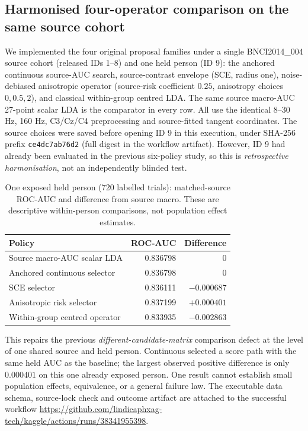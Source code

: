 \subsection{Harmonised four-operator comparison on the same source cohort}
\label{sec:p3-four-operator-matrix}
We implemented the four original proposal families under a
single BNCI2014\_004 source cohort (released IDs 1--8) and
one held person (ID 9): the anchored continuous source-AUC
search, source-contrast envelope (SCE, radius one),
noise-debiased anisotropic operator (source-risk coefficient
$0.25$, anisotropy choices $0,0.5,2$), and classical
within-group centred LDA. The same source macro-AUC
27-point scalar LDA is the comparator in every row.
All use the identical 8--30 Hz, 160 Hz, C3/Cz/C4
preprocessing and source-fitted tangent coordinates.
The source choices were saved before opening ID 9 in this
execution, under SHA-256 prefix
\texttt{ce4dc7ab76d2} (full digest in the workflow artifact).
However, ID 9 had already been evaluated in the previous
six-policy study, so this is \emph{retrospective harmonisation},
not an independently blinded test.

\begin{table}[tb]\centering\small
\caption{One exposed held person (720 labelled trials):
matched-source ROC-AUC and difference from source macro.
These are descriptive within-person comparisons, not
population effect estimates.}
\label{tab:p3-four-operator-one-person}
\begin{tabular}{lrr}\toprule
Policy & ROC-AUC & Difference\\\midrule
Source macro-AUC scalar LDA & 0.836798 & 0\\
Anchored continuous selector & 0.836798 & 0\\
SCE selector & 0.836111 & $-0.000687$\\
Anisotropic risk selector & 0.837199 & $+0.000401$\\
Within-group centred operator & 0.833935 & $-0.002863$\\
\bottomrule\end{tabular}
\end{table}

This repairs the previous \emph{different-candidate-matrix}
comparison defect at the level of one shared source and
held person. Continuous selected a score path with the
same held AUC as the baseline; the largest observed
positive difference is only $0.000401$ on this one
already exposed person. One result cannot establish
small population effects, equivalence, or a general
failure law. The executable data schema, source-lock
check and outcome artifact are attached to the successful
workflow \url{https://github.com/lindicaphxag-tech/kaggle/actions/runs/38341955398}.
